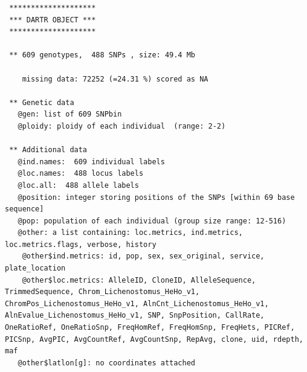 \documentclass[
  letterpaper,
  DIV=11,
  numbers=noendperiod]{scrreprt}
\newenvironment{Shaded}{\begin{snugshade}}{\end{snugshade}}
\newcommand{\CommentTok}[1]{\textcolor[rgb]{0.38,0.63,0.69}{\textit{#1}}}
\newcommand{\FunctionTok}[1]{\textcolor[rgb]{0.02,0.16,0.49}{#1}}
\newcommand{\NormalTok}[1]{\textcolor[rgb]{0.00,0.44,0.13}{#1}}
\newcommand{\SpecialCharTok}[1]{\textcolor[rgb]{0.25,0.44,0.63}{#1}}
\begin{document}
\begin{Shaded}
\end{Shaded}

\begin{verbatim}
 ********************
 *** DARTR OBJECT ***
 ********************

 ** 609 genotypes,  488 SNPs , size: 49.4 Mb

    missing data: 72252 (=24.31 %) scored as NA

 ** Genetic data
   @gen: list of 609 SNPbin
   @ploidy: ploidy of each individual  (range: 2-2)

 ** Additional data
   @ind.names:  609 individual labels
   @loc.names:  488 locus labels
   @loc.all:  488 allele labels
   @position: integer storing positions of the SNPs [within 69 base sequence]
   @pop: population of each individual (group size range: 12-516)
   @other: a list containing: loc.metrics, ind.metrics, loc.metrics.flags, verbose, history 
    @other$ind.metrics: id, pop, sex, sex_original, service, plate_location 
    @other$loc.metrics: AlleleID, CloneID, AlleleSequence, TrimmedSequence, Chrom_Lichenostomus_HeHo_v1, ChromPos_Lichenostomus_HeHo_v1, AlnCnt_Lichenostomus_HeHo_v1, AlnEvalue_Lichenostomus_HeHo_v1, SNP, SnpPosition, CallRate, OneRatioRef, OneRatioSnp, FreqHomRef, FreqHomSnp, FreqHets, PICRef, PICSnp, AvgPIC, AvgCountRef, AvgCountSnp, RepAvg, clone, uid, rdepth, maf 
   @other$latlon[g]: no coordinates attached
\end{verbatim}

\begin{Shaded}
\end{Shaded}
\end{document}
